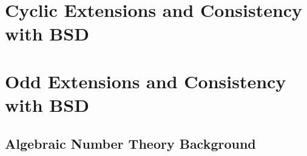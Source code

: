 \documentclass{article}
\theoremstyle{plain}
\theoremstyle{definition}
\begin{document}
\newpage
\section{Cyclic Extensions and Consistency with BSD}\label{sec_cyclic}


\newpage
\section{Odd Extensions and Consistency with BSD}\label{sec_odd}


%

\newpage
\begin{appendices}
\section{Algebraic Number Theory Background}
%

\end{appendices}

\newpage



\end{document}
